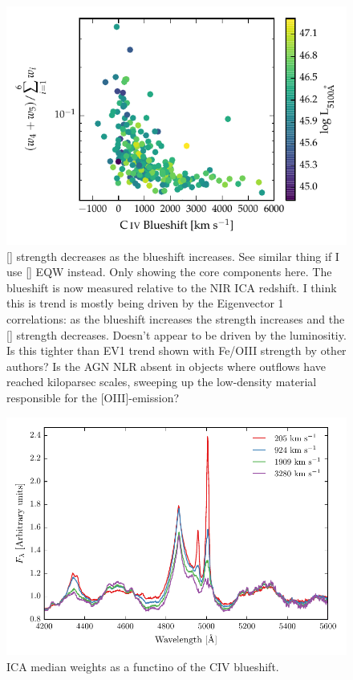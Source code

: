 \begin{figure}
    \centering
    \includegraphics[width=\textwidth]{figures/chapter04/civ_blueshift_oiii_strength.pdf} 
    \caption{[] strength decreases as the  blueshift increases. See similar thing if I use [] EQW instead. Only showing the core components here. The  blueshift is now measured relative to the NIR ICA redshift. I think this is trend is mostly being driven by the Eigenvector 1 correlations: as the blueshift increases the  strength increases and the [] strength decreases. Doesn't appear to be driven by the luminositiy. Is this tighter than EV1 trend shown with Fe/OIII strength by other authors? Is the AGN NLR absent in objects where outflows have reached
    kiloparsec scales, sweeping up the low-density material responsible for the [OIII]-emission?}     
    \label{fig:civ_blueshift_oiii_strength}
\end{figure}

\begin{figure}
    \centering
    \includegraphics[width=\columnwidth]{figures/chapter04/mfica_composites.pdf} 
    \caption{ICA median weights as a functino of the CIV blueshift.}     
    \label{fig:mfica_composites}
\end{figure}

